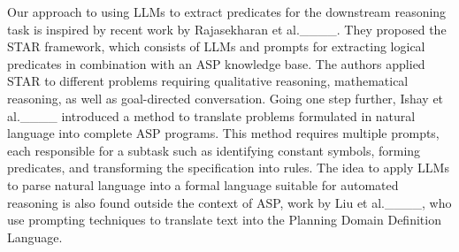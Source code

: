 Our approach to using LLMs to extract predicates for the downstream reasoning task is inspired by recent work by Rajasekharan et al.____. They proposed the STAR framework, which consists of LLMs and prompts for extracting logical predicates in combination with an ASP knowledge base. The authors applied STAR to different problems requiring qualitative reasoning, mathematical reasoning, as well as goal-directed conversation. 
%
Going one step further, Ishay et al.____ introduced a method to translate problems formulated in natural language into complete ASP programs. This method requires multiple prompts, each responsible for a subtask such as identifying constant symbols, forming predicates, and transforming the specification into rules. %
%
The idea to apply LLMs to parse natural language into a formal language suitable for automated reasoning is also found outside the context of ASP, \egc work by Liu et al.____, who use prompting techniques to translate text into the Planning Domain Definition Language.



